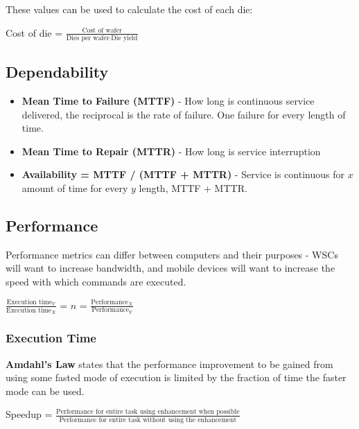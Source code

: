 \documentclass[11pt]{article}
\begin{document}
These values can be used to calculate the cost of each die:

\begin{center}
    Cost of die = $\frac{\text{Cost of wafer}}{\text{Dies per wafer}\cdot\text{Die yield}}$
\end{center}

\subsection{Dependability}

\begin{itemize}
    \item \textbf{Mean Time to Failure (MTTF)} - How long is continuous service delivered, the reciprocal is the rate of failure. One failure for every length of time.
    \item \textbf{Mean Time to Repair (MTTR)} - How long is service interruption
    \item\textbf{Availability = MTTF / (MTTF + MTTR)} - Service is continuous for $x$ amount of time for every $y$ length, MTTF + MTTR.
\end{itemize}

\subsection{Performance}

Performance metrics can differ between computers and their purposes - WSCs will want to increase bandwidth, and mobile devices will want to increase the speed with which commands are executed. 

\begin{center}
    $\frac{\text{Execution time}_Y}{\text{Execution time}_X}$ = $n$ = $\frac{\text{Performance}_X}{\text{Performance}_Y}$
\end{center}

\subsubsection{Execution Time}

\textbf{Amdahl's Law} states that the performance improvement to be gained from using some fasted mode of execution is limited by the fraction of time the faster mode can be used.

\begin{center}
    Speedup = $\frac{\text{Performance for entire task using enhancement when possible}}{\text{Performance for entire task without using the enhancement}}$
\end{center}
\end{document}

